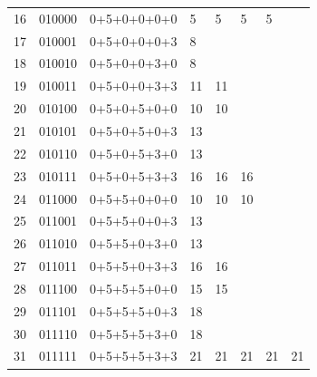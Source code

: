 \documentclass[12pt]{extarticle}
\begin{document}
\begin{center}
\begin{tabular}{ | m{1.5cm} | m{1.7cm} | m{3cm} | m{1.2cm} | m{1.3cm} | m{1.3cm} | m{1.5cm} | m{1.5cm} |}
 16 & 010000 & 0+5+0+0+0+0 & 5 &                    5 & 5                  & 5                   &\\
 \cline{1-4}
 17 & 010001 & 0+5+0+0+0+3 & 8 & \multirow{2}{*}{ }   & \multirow{6}{*}{ } & \multirow{14}{*}{}  &\\
 \cline{1-4}
 18 & 010010 & 0+5+0+0+3+0 & 8 &                      &                    &                     &\\
 \cline{1-4}
 19 & 010011 & 0+5+0+0+3+3 & 11 &                  11 &                    &                     &\\
 \cline{1-5}
 20 & 010100 & 0+5+0+5+0+0 & 10 &                  10 &                    &                     &\\
 \cline{1-4}
 21 & 010101 & 0+5+0+5+0+3 & 13 & \multirow{2}{*}{ }  &                    &                     &\\
 \cline{1-4}
 22 & 010110 & 0+5+0+5+3+0 & 13 &                     &                    &                     &\\
 \cline{1-4}
 23 & 010111 & 0+5+0+5+3+3 & 16 &                  16 & 16                 &                     &\\
 \cline{1-6}

 24 & 011000 & 0+5+5+0+0+0 & 10 &                  10 & 10                 &                     &\\
 \cline{1-4}
 25 & 011001 & 0+5+5+0+0+3 & 13 & \multirow{2}{*}{ }   & \multirow{6}{*}{ } &                    &\\
 \cline{1-4}
 26 & 011010 & 0+5+5+0+3+0 & 13 &                      &                    &                    &\\
 \cline{1-4}
 27 & 011011 & 0+5+5+0+3+3 & 16 &                   16 &                    &                    &\\
 \cline{1-5}
 28 & 011100 & 0+5+5+5+0+0 & 15 &                   15 &                    &                    &\\
 \cline{1-4}
 29 & 011101 & 0+5+5+5+0+3 & 18 & \multirow{2}{*}{ }   &                    &                    &\\
 \cline{1-4}
 30 & 011110 & 0+5+5+5+3+0 & 18 &                      &                    &                    &\\
 \cline{1-4}
 31 & 011111 & 0+5+5+5+3+3 & 21 &                   21 & 21                 & 21                 & 21\\
 \cline{1-8}


\end{tabular}
\end{center}
\end{document}
